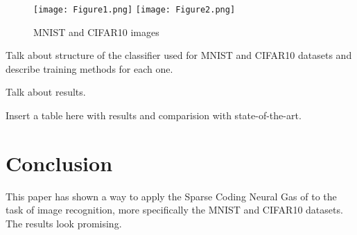 \documentclass[runningheads,a4paper]{llncs}
\begin{document}
\begin{figure}
\centering
\texttt{[image: Figure1.png]}
\texttt{[image: Figure2.png]}
\caption{MNIST and CIFAR10 images}
\label{fig:MNISTAndCIFAR10Images}
\end{figure}

Talk about structure of the classifier used for MNIST and CIFAR10 datasets and describe training methods for each one.

Talk about results.

Insert a table here with results and comparision with state-of-the-art.

\section{Conclusion}

This paper has shown a way to apply the Sparse Coding Neural Gas of \cite{LaBaMa09} to the task of image recognition, more specifically the MNIST and CIFAR10 datasets. The results look promising.



\end{document}
